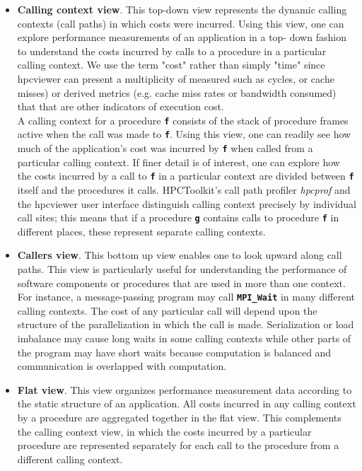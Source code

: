 \documentclass[a4paper,11pt]{article}
\begin{document}
\begin{itemize}
	\item \textbf{Calling context view}. This top-down view represents the dynamic calling contexts (call paths) in which costs were incurred. Using this view,  one can explore performance measurements of an application in a top-  down fashion to understand the costs  incurred by calls to a procedure  in a particular calling context. We use the term "cost" rather than simply "time" since hpcviewer can present a multiplicity  of measured such as cycles, or cache misses) or derived metrics (e.g. cache miss rates or  bandwidth consumed) that that are other indicators of execution cost.
\\  A calling context for a procedure \textbf{\texttt{f}} consists of the stack of procedure frames active when the call was made to  \textbf{\texttt{f}}. 
Using this view, one can readily see how much of the application's  cost was incurred by \textbf{\texttt{f}} when called from a particular calling context. If  finer detail is of interest, one can explore how the costs incurred by a call  to \textbf{\texttt{f}} in a particular context are divided between \textbf{\texttt{f}} itself and the procedures  it calls. HPCToolkit's call path profiler \textit{hpcprof} and the hpcviewer  user interface distinguish calling context precisely by individual call  sites; this means that if a procedure \textbf{\texttt{g}} contains calls to procedure \textbf{\texttt{f}} in  different places, these represent separate calling contexts. 

	\item \textbf{Callers view}. This bottom up view enables one to look upward along  call paths. This view is particularly useful for understanding the performance of software components or procedures that are used in more  than one context. For instance, a message-passing program may call  \textbf{\texttt{MPI\_Wait}} in many different calling contexts. The cost of any particular call will depend upon the structure of the parallelization in which   the call is made.   Serialization or load imbalance may cause long waits  in some calling contexts while other parts of the program may have  short waits because computation is balanced and communication is  overlapped with computation.  
	\item \textbf{Flat view}. This view organizes performance measurement data according to the static structure of an application. All costs incurred in any  calling context by a procedure are aggregated together in the flat view.  This complements the calling context view, in which the costs incurred  by a particular procedure are represented separately for each call to  the procedure from a different calling context.  

\end{itemize}
\end{document}
